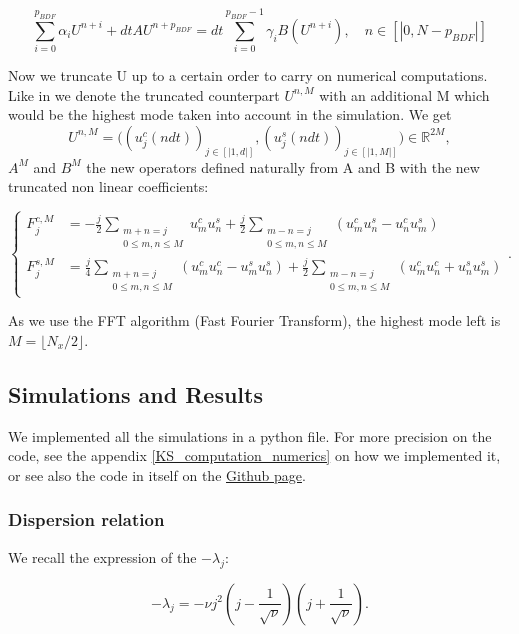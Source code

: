 \documentclass[12pt]{article}
\begin{document}
\begin{equation}
    \boxed{
    \sum_{i=0}^{p_{BDF}} \alpha_i U^{n+i} + dtAU^{n+p_{BDF}} = dt\sum_{i=0}^{p_{BDF}-1} \gamma_iB(U^{n+i}), \quad n\in [|0, N-p_{BDF}|]
    }
\end{equation}

Now we truncate U up to a certain order to carry on numerical computations. Like in \cite{Scheme_for_KS} we denote the truncated counterpart $U^{n, M}$ with an additional M which would be the highest mode taken into account in the simulation.  We get $$U^{n, M} = \Big((u_j^c(ndt))_{j\in [|1,d|]}, (u_j^s(ndt))_{j\in [|1,M|]} \Big)\in \mathbb{R}^{2M},$$ 
$A^M$ and $B^M$ the new operators defined naturally from A and B with the new truncated non linear coefficients:

\begin{equation}
\left\{
\begin{aligned}
    F_j^{c, M} &= -\frac{j}{2} \sum_{\substack{m+n=j \\ 0\leq m, n \leq M}}u_m^cu_n^s + \frac{j}{2} \sum_{\substack{m-n=j\\ 0\leq m, n \leq M}}(u_m^cu_n^s - u_n^cu_m^s) \\
    F_j^{s, M} &= \frac{j}{4} \sum_{\substack{m+n=j \\ 0\leq m, n \leq M}}(u_m^cu_n^c - u_m^su_n^s)+ \frac{j}{2} \sum_{\substack{m-n=j \\ 0\leq m, n \leq M}}(u_m^cu_n^c + u_n^su_m^s)    
\end{aligned}
\right..
\end{equation}


As we use the FFT algorithm (Fast Fourier Transform), the highest mode left is $M =\lfloor N_x/2 \rfloor.$

\subsection{Simulations and Results}
 We implemented all the simulations in a python file. For more precision on the code, see the appendix \ref{KS_computation_numerics} on how we implemented it, or see also the code in itself on the \href{https://github.com/Bilal59170/Repo_Warwick_internship}{Github page}.  

\subsubsection{Dispersion relation}
We recall the expression of the $-\lambda_j:$

\begin{equation}
    -\lambda_j = -\nu j^2(j-\frac{1}{\sqrt{\nu}})(j+\frac{1}{\sqrt{\nu}}).
\end{equation}
\end{document}
